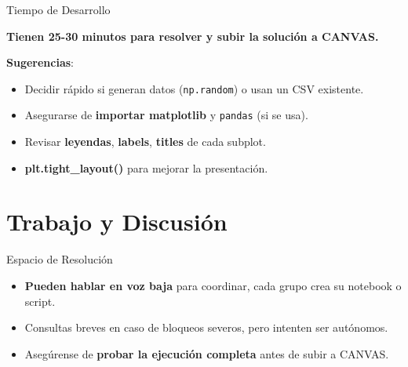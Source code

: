 \documentclass[10pt]{beamer}
\begin{document}
\begin{frame}{Tiempo de Desarrollo}
  \begin{block}{}
    \huge{\textbf{Tienen 25-30 minutos para resolver y subir la solución a CANVAS.}}
  \end{block}
  \vspace{0.3cm}
  \textbf{Sugerencias}:
  \begin{itemize}
    \item Decidir rápido si generan datos (\texttt{np.random}) o usan un CSV existente.
    \item Asegurarse de \textbf{importar matplotlib} y \texttt{pandas} (si se usa).
    \item Revisar \textbf{leyendas}, \textbf{labels}, \textbf{titles} de cada subplot.
    \item \textbf{plt.tight\_layout()} para mejorar la presentación.
  \end{itemize}
\end{frame}

\section{Trabajo y Discusión}

\begin{frame}{Espacio de Resolución}
  \begin{itemize}
    \item \textbf{Pueden hablar en voz baja} para coordinar, cada grupo crea su notebook o script.
    \item Consultas breves en caso de bloqueos severos, pero intenten ser autónomos.
    \item Asegúrense de \textbf{probar la ejecución completa} antes de subir a CANVAS.
  \end{itemize}
\end{frame}
\end{document}
